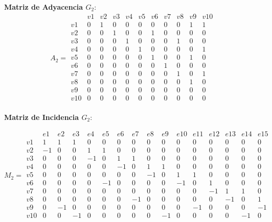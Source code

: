\documentclass{article}
\begin{document}
\textbf{Matriz de Adyacencia \( G_2 \)}:
\[
A_2 =
\begin{array}{c|cccccccccc}
    & v1 & v2 & v3 & v4 & v5 & v6 & v7 & v8 & v9 & v10 \\
\hline
v1 & 0 & 1 & 0 & 0 & 0 & 0 & 0 & 0 & 1 & 1 \\
v2 & 0 & 0 & 1 & 0 & 0 & 1 & 0 & 0 & 0 & 0 \\
v3 & 0 & 0 & 0 & 1 & 0 & 0 & 0 & 1 & 0 & 0 \\
v4 & 0 & 0 & 0 & 0 & 1 & 0 & 0 & 0 & 0 & 1 \\
v5 & 0 & 0 & 0 & 0 & 0 & 1 & 0 & 0 & 1 & 0 \\
v6 & 0 & 0 & 0 & 0 & 0 & 0 & 1 & 0 & 0 & 0 \\
v7 & 0 & 0 & 0 & 0 & 0 & 0 & 0 & 1 & 0 & 1 \\
v8 & 0 & 0 & 0 & 0 & 0 & 0 & 0 & 0 & 1 & 0 \\
v9 & 0 & 0 & 0 & 0 & 0 & 0 & 0 & 0 & 0 & 0 \\
v10& 0 & 0 & 0 & 0 & 0 & 0 & 0 & 0 & 0 & 0 \\
\end{array}
\]

\textbf{Matriz de Incidencia \( G_2 \)}:

\setcounter{MaxMatrixCols}{20}
\[
M_2 =
\begin{array}{c|ccccccccccccccc}
    & e1 & e2 & e3 & e4 & e5 & e6 & e7 & e8 & e9 & e10 & e11 & e12 & e13 & e14 & e15 \\
\hline
v1 & 1  & 1  & 1  & 0  & 0  & 0  & 0  & 0  & 0  & 0  & 0  & 0  & 0  & 0  & 0   \\
v2 & -1 & 0  & 0  & 1  & 1  & 0  & 0  & 0  & 0  & 0  & 0  & 0  & 0  & 0  & 0   \\
v3 & 0  & 0  & 0  & -1 & 0  & 1  & 1  & 0  & 0  & 0  & 0  & 0  & 0  & 0  & 0   \\
v4 & 0  & 0  & 0  & 0  & 0  & -1 & 0  & 1  & 1  & 0  & 0  & 0  & 0  & 0  & 0   \\
v5 & 0  & 0  & 0  & 0  & 0  & 0  & 0  & -1 & 0  & 1  & 1  & 0  & 0  & 0  & 0   \\
v6 & 0  & 0  & 0  & 0  & -1 & 0  & 0  & 0  & 0  & -1 & 0  & 1  & 0  & 0  & 0   \\
v7 & 0  & 0  & 0  & 0  & 0  & 0  & 0  & 0  & 0  & 0  & 0  & -1 & 1  & 1  & 0   \\
v8 & 0  & 0  & 0  & 0  & 0  & 0  & -1 & 0  & 0  & 0  & 0  & 0  & -1 & 0  & 1   \\
v9 & 0  & -1 & 0  & 0  & 0  & 0  & 0  & 0  & 0  & 0  & -1 & 0  & 0  & 0  & -1  \\
v10& 0  & 0  & -1 & 0  & 0  & 0  & 0  & 0  & -1 & 0  & 0  & 0  & 0  & -1 & 0   \\
\end{array}
\]
\end{document}
